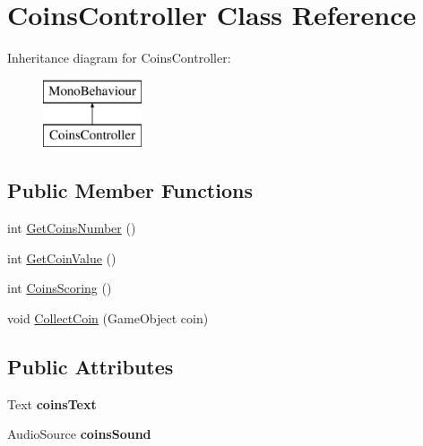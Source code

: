 \hypertarget{class_coins_controller}{}\section{Coins\+Controller Class Reference}
\label{class_coins_controller}
Inheritance diagram for Coins\+Controller\+:\begin{figure}[H]
\begin{center}
\leavevmode
\includegraphics[height=2.000000cm]{class_coins_controller}
\end{center}
\end{figure}
\subsection*{Public Member Functions}
\begin{DoxyCompactItemize}
\item 
int \mbox{\hyperlink{class_coins_controller_a6e0fbd9f7b9266080de287fe5f3dac83}{Get\+Coins\+Number}} ()
\item 
int \mbox{\hyperlink{class_coins_controller_a9daadf203b6626fa3ec7dfa0430c08e5}{Get\+Coin\+Value}} ()
\item 
int \mbox{\hyperlink{class_coins_controller_ad2dfabb2b5d8a596964e642709617833}{Coins\+Scoring}} ()
\item 
void \mbox{\hyperlink{class_coins_controller_a9c72eb14a73df2248a45b520cc05f0af}{Collect\+Coin}} (Game\+Object coin)
\end{DoxyCompactItemize}
\subsection*{Public Attributes}
\begin{DoxyCompactItemize}
\item 
\mbox{\label{class_coins_controller_afa65e5d8d2ae8007e592a51463aeef3c}} 
Text {\bfseries coins\+Text}
\item 
\mbox{\label{class_coins_controller_afe03fc3b89736d9eca89a8c3a7c933ff}} 
Audio\+Source {\bfseries coins\+Sound}
\end{DoxyCompactItemize}
